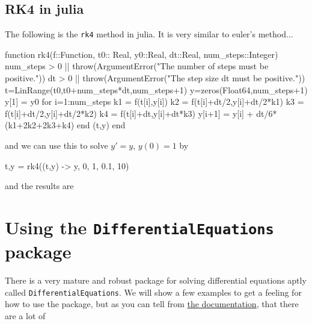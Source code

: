 \subsection{RK4 in julia}

The following is the \texttt{rk4} method in julia.  It is very similar to euler's method...

\begin{jlblock}[diffeq]
function rk4(f::Function, t0:: Real, y0::Real, dt::Real, num_steps::Integer)
  num_steps > 0 || throw(ArgumentError("The number of steps must be positive."))
  dt > 0 || throw(ArgumentError("The step size dt must be positive."))
  t=LinRange(t0,t0+num_steps*dt,num_steps+1)
  y=zeros(Float64,num_steps+1)
  y[1] = y0
  for i=1:num_steps
    k1 = f(t[i],y[i])
    k2 = f(t[i]+dt/2,y[i]+dt/2*k1)
    k3 = f(t[i]+dt/2,y[i]+dt/2*k2)
    k4 = f(t[i]+dt,y[i]+dt*k3)
    y[i+1] = y[i] + dt/6*(k1+2k2+2k3+k4)
  end
  (t,y)
end
\end{jlblock}
and we can use this to solve $y'=y$, $y(0)=1$ by
\begin{jlblock}[diffeq]
t,y = rk4((t,y) -> y, 0, 1, 0.1, 10)
\end{jlblock}
and the results are  \printpythontex[verbatim]



\section{Using the \texttt{DifferentialEquations} package} 

There is a very mature and robust package for solving differential equations aptly called \texttt{DifferentialEquations}.  We will show a few examples to get a feeling for how to use the package, but as you can tell from \href{https://docs.sciml.ai/dev/index.html}{the documentation}, that there are a lot of 


